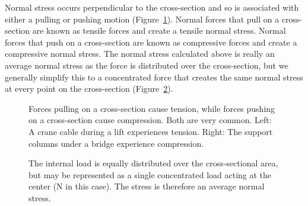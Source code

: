 \documentclass[
  letterpaper,
  DIV=11,
  numbers=noendperiod]{scrreprt}
\theoremstyle{definition}
\theoremstyle{remark}
\begin{document}
Normal stress occurs perpendicular to the cross-section and so is
associated with either a pulling or pushing motion
(Figure~\ref{fig-2.1}). Normal forces that pull on a cross-section are
known as tensile forces and create a tensile normal stress. Normal
forces that push on a cross-section are known as compressive forces and
create a compressive normal stress. The normal stress calculated above
is really an average normal stress as the force is distributed over the
cross-section, but we generally simplify this to a concentrated force
that creates the same normal stress at every point on the cross-section
(Figure~\ref{fig-2.2}).

\begin{figure}


\caption{\label{fig-2.1}Forces pulling on a cross-section cause tension,
while forces pushing on a cross-section cause compression. Both are very
common. Left: A crane cable during a lift experiences tension. Right:
The support columns under a bridge experience compression.}

\end{figure}%

\begin{figure}


\caption{\label{fig-2.2}The internal load is equally distributed over
the cross-sectional area, but may be represented as a single
concentrated load acting at the center (N in this case). The stress is
therefore an average normal stress.}

\end{figure}%
\end{document}
